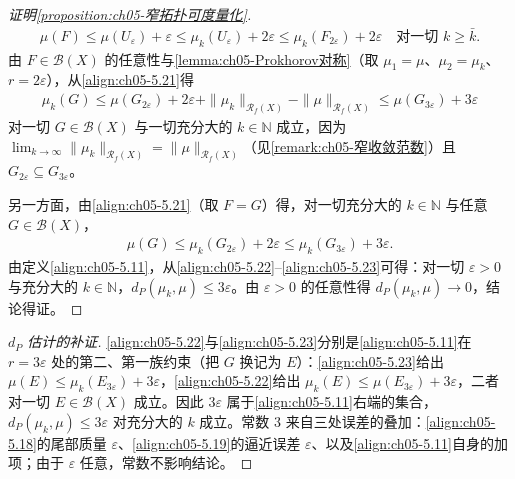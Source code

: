 \documentclass[../../main.tex]{subfiles}%
\begin{document}
\begin{proof}[证明\cref{proposition:ch05-窄拓扑可度量化}]
\begin{align}
\mu(F)\leqslant\mu(U_\varepsilon)+\varepsilon
\leqslant\mu_k(U_\varepsilon)+2\varepsilon
\leqslant\mu_k(F_{2\varepsilon})+2\varepsilon
\quad\text{对一切 }k\geqslant\bar{k}.\label{align:ch05-5.21}
\end{align}
由 $F\in\mathscr{B}(X)$ 的任意性与\cref{lemma:ch05-Prokhorov对称}（取 $\mu_1=\mu$、$\mu_2=\mu_k$、$r=2\varepsilon$），从\eqref{align:ch05-5.21}得
\begin{align}
\mu_k(G)\leqslant\mu(G_{2\varepsilon})+2\varepsilon
+\|\mu_k\|_{\mathscr{R}_f(X)}-\|\mu\|_{\mathscr{R}_f(X)}
\leqslant\mu(G_{3\varepsilon})+3\varepsilon\label{align:ch05-5.22}
\end{align}
对一切 $G\in\mathscr{B}(X)$ 与一切充分大的 $k\in\mathbb{N}$ 成立，因为 $\lim_{k\to\infty}\|\mu_k\|_{\mathscr{R}_f(X)}=\|\mu\|_{\mathscr{R}_f(X)}$（见\cref{remark:ch05-窄收敛范数}）且 $G_{2\varepsilon}\subseteq G_{3\varepsilon}$。

另一方面，由\eqref{align:ch05-5.21}（取 $F=G$）得，对一切充分大的 $k\in\mathbb{N}$ 与任意 $G\in\mathscr{B}(X)$，
\begin{align}
\mu(G)\leqslant\mu_k(G_{2\varepsilon})+2\varepsilon\leqslant\mu_k(G_{3\varepsilon})+3\varepsilon.\label{align:ch05-5.23}
\end{align}
由定义\eqref{align:ch05-5.11}，从\eqref{align:ch05-5.22}–\eqref{align:ch05-5.23}可得：对一切 $\varepsilon>0$ 与充分大的 $k\in\mathbb{N}$，$d_P(\mu_k,\mu)\leqslant3\varepsilon$。由 $\varepsilon>0$ 的任意性得 $d_P(\mu_k,\mu)\to0$，结论得证。
\end{proof}

\begin{proof}[$d_P$ 估计的补证]
\eqref{align:ch05-5.22}与\eqref{align:ch05-5.23}分别是\eqref{align:ch05-5.11}在 $r=3\varepsilon$ 处的第二、第一族约束（把 $G$ 换记为 $E$）：\eqref{align:ch05-5.23}给出 $\mu(E)\leqslant\mu_k(E_{3\varepsilon})+3\varepsilon$，\eqref{align:ch05-5.22}给出 $\mu_k(E)\leqslant\mu(E_{3\varepsilon})+3\varepsilon$，二者对一切 $E\in\mathscr{B}(X)$ 成立。因此 $3\varepsilon$ 属于\eqref{align:ch05-5.11}右端的集合，$d_P(\mu_k,\mu)\leqslant3\varepsilon$ 对充分大的 $k$ 成立。常数 $3$ 来自三处误差的叠加：\eqref{align:ch05-5.18}的尾部质量 $\varepsilon$、\eqref{align:ch05-5.19}的逼近误差 $\varepsilon$、以及\eqref{align:ch05-5.11}自身的加项；由于 $\varepsilon$ 任意，常数不影响结论。
\end{proof}
\end{document}
